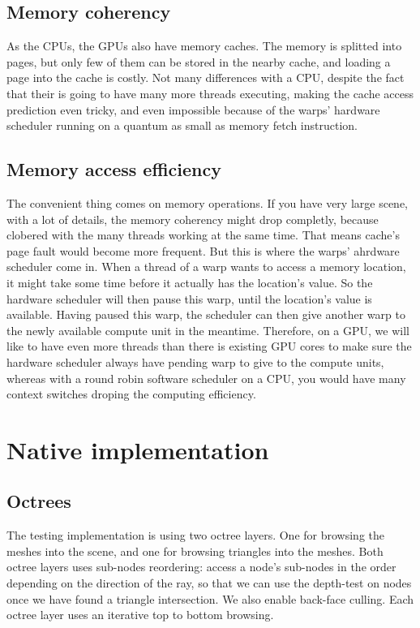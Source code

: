 \documentclass[11pt,twocolumn,a4paper]{article}
\begin{document}
\subsection{Memory coherency}
As the CPUs, the GPUs also have memory caches. The memory is splitted into pages,
but only few of them can be stored in the nearby cache, and loading a page into
the cache is costly. Not many differences with a CPU, despite the fact that
their is going to have many more threads executing, making the cache access prediction
even tricky, and even impossible because of the warps' hardware scheduler running
on a quantum as small as memory fetch instruction.

\subsection{Memory access efficiency}
The convenient thing comes on memory operations. If you have very large scene, with a
lot of details, the memory coherency might drop completly, because clobered with
the many threads working at the same time. That means cache's page fault would become more frequent.
But this is where the warps' ahrdware scheduler come in. When a thread of a
warp wants to access a memory
location, it might take some time before it actually has the location's value.
So the hardware scheduler will then pause this warp, until the location's value
is available. Having paused this warp, the scheduler can then give another
warp to the newly available compute unit in the meantime. Therefore, on a GPU, we will
like to have even more threads than there is existing GPU cores to make sure the
hardware scheduler always have pending warp to give to the compute units, whereas
with a round robin software scheduler on a CPU, you would have many context
switches droping the computing efficiency.

\section{Native implementation}
\subsection{Octrees}
The testing implementation is using two octree layers. One for browsing the meshes
into the scene, and one for browsing triangles into the meshes. Both octree layers
uses sub-nodes reordering: access a node's sub-nodes in the order depending on
the direction of the ray, so that we can use the depth-test on nodes once we
have found a triangle intersection. We also enable back-face culling. Each octree
layer uses an iterative top to bottom browsing.
\end{document}
